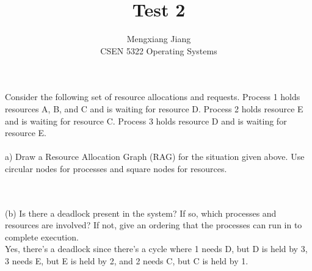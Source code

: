\documentclass[12pt]{article}
\newenvironment{problem}[2][Problem]{\begin{trivlist}
\item[\hskip \labelsep {\bfseries #1}\hskip \labelsep {\bfseries #2.}]}{\end{trivlist}}
\begin{document}
 
 
\title{Test 2}%
\author{Mengxiang Jiang\\ %
CSEN 5322 Operating Systems} %
 
\maketitle
 
\begin{problem}{1} %
  Consider the following set of resource allocations and requests. Process
  1 holds resources A, B, and C and is waiting for resource D. Process 2 holds resource E and
  is waiting for resource C. Process 3 holds resource D and is waiting for resource E.\\\\
  a) Draw a Resource Allocation Graph (RAG) for the situation given above. Use circular
  nodes for processes and square nodes for resources.\\\\
\\(b) Is there a deadlock present in the system? If so, which processes and resources are
involved? If not, give an ordering that the processes can run in to complete execution.\\
Yes, there's a deadlock since there's a cycle where 1 needs D, but D is held by 3, 3 needs E, but E is held by 2, and 2 needs C, but C is held by 1.
\end{problem}
\end{document}
